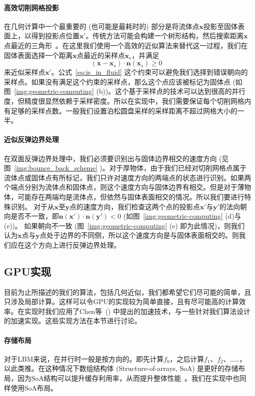 \paragraph{高效切削网格投影}
在几何计算中一个最重要的 (也可能是最耗时的) 部分是将流体点$\bm{x}$投影至固体表面上，以得到投影点位置$\bm{x}'$。传统方法可能会构建一个树形结构，然后搜索距离$\bm{x}$点最近的三角形~\cite{wang-2012}。在这里我们使用一个高效的近似算法来替代这一过程，我们在固体表面选择一个距离$\bm{x}$点最近的采样点$\bm{x}_s$，并满足
\begin{equation}\label{eq:is_in_fluid}
(\bm{x}-\bm{x}_s)\cdot \bm{n}(\bm{x}_s) \geq 0\;
\end{equation}
来近似采样点$\bm{x}'$。公式~\ref{eq:is_in_fluid} 这个约束可以避免我们选择到错误朝向的采样点。如果没有满足这个约束的采样点，那么这个点应该被标记为固体点 (如图~\ref{img:geometric-computing} (b))。这个基于采样点的技术可以达到很高的并行度，但精度很显然依赖于采样密度。所以在实现中，我们需要保证每个切削网格内有足够的采样点数。一般我们设置泊松圆盘采样的采样距离不超过网格大小的一半。

\paragraph{近似反弹边界处理}
在双面反弹边界处理中，我们必须要识别出与固体边界相交的速度方向 (见图~\ref{img:bounce_back_scheme} )。对于厚物体，由于我们已经对切削网格点属于流体点或固体点有所标记，我们只许对速度方向的两端点的状态进行识别。如果两个端点分别为流体点和固体点，则这个速度方向与固体边界有相交。但是对于薄物体，可能存在两端均是流体点，但依然与固体表面相交的情况。所以我们要进行特殊识别。
对于从$\bm{x}$至$\bm{y}$点的速度方向，我们检查这两个点的投影点$\bm{x}'$与$\bm{y}'$的法向朝向是否不一致，即$\bm{n}(\bm{x}')\!\cdot\!\bm{n}(\bm{y'})\!<\!0$ (如图~\ref{img:geometric-computing} (d)与(e))。
如果朝向不一致 (图~\ref{img:geometric-computing} (e) 即为此情况)，则我们认为$\bm{x}$点与$\bm{y}$点处于边界的不同侧，所以这个速度方向是与固体表面相交的。则我们应在这个方向上进行反弹边界处理。

\subsection{GPU实现}
目前为止所描述的我们的算法，包括几何近似，我们都希望它们尽可能的简单，且只涉及局部计算。这样可以令GPU的实现较为简单直接，且有尽可能高的计算效率。在实现时我们应用了Chen等~(\citeyear{Chen-2021}) 中提出的加速技术，与一些针对我们算法设计的加速实现。这些实现方法在本节进行讨论。

\paragraph{存储布局}
对于LBM来说，在并行时一般是按方向的。即先计算$f_0$，之后计算$f_1$、$f_2$、……，以此类推。在这种情况下数组结构体 (Structure-of-arrays, SoA) 是更好的存储布局，因为SoA结构可以提升缓存利用率，从而提升整体性能~\cite{Chen-2021}。我们在实现中也同样使用SoA布局。

